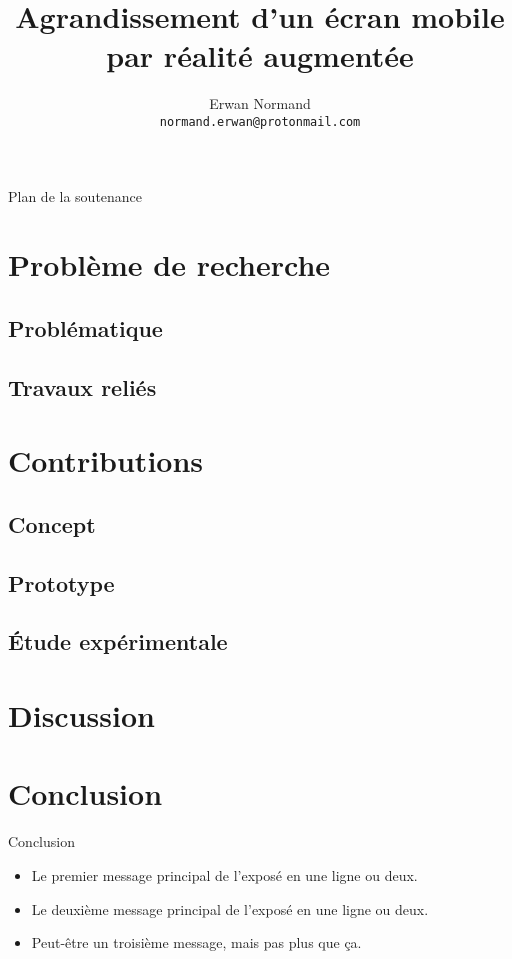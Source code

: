 \documentclass{beamer}
\title[Agrandissement d'un écran mobile par RA]{Agrandissement d'un écran mobile par réalité augmentée}
\author{Erwan Normand \\ \texttt{normand.erwan@protonmail.com}}
\institute{École de Technologie Supérieure}
\date{\frenchdate{2018}{08}{29}}
\begin{document}
\maketitle

\begin{frame}{Plan de la soutenance}
  \tableofcontents
\end{frame}


\section{Problème de recherche}
\subsection{Problématique} %

\subsection{Travaux reliés} %


\section{Contributions}
\subsection{Concept} %

\subsection{Prototype} %

\subsection{Étude expérimentale} %


\section{Discussion} %


\section*{Conclusion}
\begin{frame}{Conclusion}
  \begin{itemize}
    \item Le \alert{premier message principal} de l'exposé en une ligne ou deux.
    \item Le \alert{deuxième message principal} de l'exposé en une ligne ou deux.
    \item Peut-être un \alert{troisième message}, mais pas plus que ça.
  \end{itemize}
\end{frame}
\end{document}
